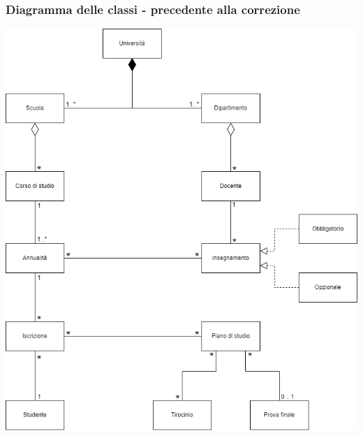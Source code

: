 \documentclass{article}
\begin{document}
\subsubsection*{Diagramma delle classi - precedente alla correzione}
\large
\vspace*{27pt}
\begin{center}
    \includegraphics[width=1.05\textwidth]{foto 2.png}
\end{center}
\end{document}
